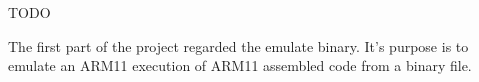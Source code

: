 TODO

The first part of the project regarded the emulate binary. It's purpose is to emulate an ARM11 execution of ARM11 assembled code from a binary file.

